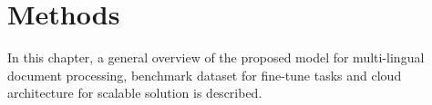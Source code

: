 \chapter{Methods}

In this chapter, a general overview of the proposed model for multi-lingual document processing, benchmark dataset for fine-tune tasks and cloud architecture for scalable solution is described. 

 



